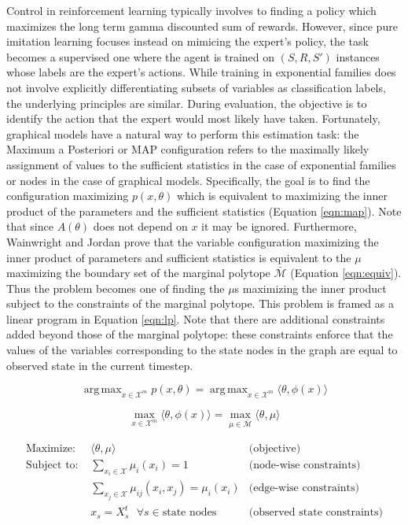 \documentclass{article} %
\DeclareMathOperator*{\argmax}{arg\,max}
\begin{document}
Control in reinforcement learning typically involves to finding a policy which maximizes the long term gamma discounted sum of rewards. However, since pure imitation learning focuses instead on mimicing the expert's policy, the task becomes a supervised one where the agent is trained on $(S,R,S')$ instances whose labels are the expert's actions. While training in exponential families does not involve explicitly differentiating subsets of variables as classification labels, the underlying principles are similar. During evaluation, the objective is to identify the action that the expert would most likely have taken. Fortunately, graphical models have a natural way to perform this estimation task: the Maximum a Posteriori or MAP configuration refers to the maximally likely assignment of values to the sufficient statistics in the case of exponential families or nodes in the case of graphical models. Specifically, the goal is to find the configuration maximizing $p(x,\theta)$ which is equivalent to maximizing the inner product of the parameters and the sufficient statistics (Equation \ref{eqn:map}). Note that since $A(\theta)$ does not depend on $x$ it may be ignored. Furthermore, Wainwright and Jordan \cite{wainwright08} prove that the variable configuration maximizing the inner product of parameters and sufficient statistics is equivalent to the $\mu$ maximizing the boundary set of the marginal polytope $\bar{\mathcal{M}}$ (Equation \ref{eqn:equiv}). Thus the problem becomes one of finding the $\mu$s maximizing the inner product subject to the constraints of the marginal polytope. This problem is framed as a linear program in Equation \ref{eqn:lp}. Note that there are additional constraints added beyond those of the marginal polytope: these constraints enforce that the values of the variables corresponding to the state nodes in the graph are equal to observed state in the current timestep.

\begin{equation}
\argmax_{x \in \mathcal{X}^m} p(x,\theta) = \argmax_{x \in \mathcal{X}^m} \langle \theta, \phi(x) \rangle
\label{eqn:map}
\end{equation}

\begin{equation}
\max_{x \in \mathcal{X}^m} \langle \theta,\phi(x) \rangle = \max_{\mu \in \bar{\mathcal{M}}} \langle \theta, \mu \rangle
\label{eqn:equiv}
\end{equation}

\begin{equation}
\begin{array}{llr}
\textrm{Maximize: } & \langle \theta, \mu \rangle & \textrm{(objective)}\\
\textrm{Subject to: } & \sum_{x_i \in \mathcal{X}} \mu_i(x_i) = 1 & \textrm{(node-wise constraints)}\\
& \sum_{x_j \in \mathcal{X}} \mu_{ij}(x_i,x_j) = \mu_i(x_i) & \textrm{(edge-wise constraints)}\\
& x_s = X_s^t \textrm{ } \forall s \in \textrm{state nodes} & \textrm{(observed state constraints)}
\end{array}
\label{eqn:lp}
\end{equation}
\end{document}
